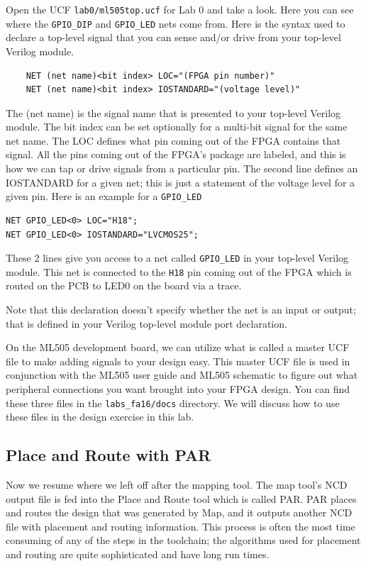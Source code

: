 \documentclass[11pt]{article}
\begin{document}
Open the UCF \verb|lab0/ml505top.ucf| for Lab 0 and take a look. Here you can see where the \verb|GPIO_DIP| and \verb|GPIO_LED| nets come from. Here is the syntax used to declare a top-level signal that you can sense and/or drive from your top-level Verilog module.

\begin{verbatim}
	NET (net name)<bit index> LOC="(FPGA pin number)"
	NET (net name)<bit index> IOSTANDARD="(voltage level)"
\end{verbatim}

The (net name) is the signal name that is presented to your top-level Verilog module. The bit index can be set optionally for a multi-bit signal for the same net name. The LOC defines what pin coming out of the FPGA contains that signal. All the pins coming out of the FPGA's package are labeled, and this is how we can tap or drive signals from a particular pin. The second line defines an IOSTANDARD for a given net; this is just a statement of the voltage level for a given pin. Here is an example for a \verb|GPIO_LED|

\begin{verbatim}
NET GPIO_LED<0> LOC="H18";
NET GPIO_LED<0> IOSTANDARD="LVCMOS25";
\end{verbatim}

These 2 lines give you access to a net called \verb|GPIO_LED| in your top-level Verilog module. This net is connected to the \verb|H18| pin coming out of the FPGA which is routed on the PCB to LED0 on the board via a trace.

Note that this declaration doesn't specify whether the net is an input or output; that is defined in your Verilog top-level module port declaration.

On the ML505 development board, we can utilize what is called a master UCF file to make adding signals to your design easy. This master UCF file is used in conjunction with the ML505 user guide and ML505 schematic to figure out what peripheral connections you want brought into your FPGA design. You can find these three files in the \verb|labs_fa16/docs| directory. We will discuss how to use these files in the design exercise in this lab.

\subsection{Place and Route with PAR}
Now we resume where we left off after the mapping tool. The map tool's NCD output file is fed into the Place and Route tool which is called PAR. PAR places and routes the design that was generated by Map, and it outputs another NCD file with placement and routing information. This process is often the most time consuming of any of the steps in the toolchain; the algorithms used for placement and routing are quite sophisticated and have long run times.
\end{document}
